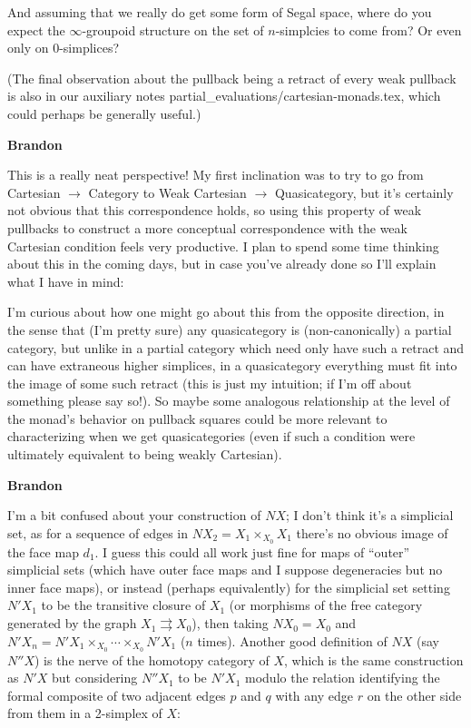 \documentclass{amsart}
\newcommand{\respond}[1]{
  \vspace{1em} \textbf{#1}
}
\begin{document}
And assuming that we really do get some form of Segal space, where do you expect the $\infty$-groupoid structure on the set of $n$-simplcies to come from? Or even only on $0$-simplices?

(The final observation about the pullback being a retract of every weak pullback is also in our auxiliary notes partial\_evaluations/cartesian-monads.tex, which could perhaps be generally useful.)

\respond{Brandon}

This is a really neat perspective!  My first inclination was to try to go from Cartesian $\rightarrow$ Category to Weak Cartesian $\rightarrow$ Quasicategory, but it's certainly not obvious that this correspondence holds, so using this property of weak pullbacks to construct a more conceptual correspondence with the weak Cartesian condition feels very productive.  I plan to spend some time thinking about this in the coming days, but in case you've already done so I'll explain what I have in mind:

I'm curious about how one might go about this from the opposite direction, in the sense that (I'm pretty sure) any quasicategory is (non-canonically) a partial category, but unlike in a partial category which need only have such a retract and can have extraneous higher simplices, in a quasicategory everything must fit into the image of some such retract (this is just my intuition; if I'm off about something please say so!). So maybe some analogous relationship at the level of the monad's behavior on pullback squares could be more relevant to characterizing when we get quasicategories (even if such a condition were ultimately equivalent to being weakly Cartesian).

\respond{Brandon}

I'm a bit confused about your construction of $NX$; I don't think it's a simplicial set, as for a sequence of edges in $NX_2 = X_1 \times_{X_0} X_1$ there's no obvious image of the face map $d_1$.  I guess this could all work just fine for maps of ``outer'' simplicial sets (which have outer face maps and I suppose degeneracies but no inner face maps), or instead (perhaps equivalently) for the simplicial set setting $N'X_1$ to be the transitive closure of $X_1$ (or morphisms of the free category generated by the graph $X_1 \rightrightarrows X_0$), then taking $NX_0=X_0$ and $N'X_n=N'X_1 \times_{X_0} \cdots \times_{X_0} N'X_1$ ($n$ times). Another good definition of $NX$ (say $N''X$) is the nerve of the homotopy category of $X$, which is the same construction as $N'X$ but considering $N''X_1$ to be $N'X_1$ modulo the relation identifying the formal composite of two adjacent edges $p$ and $q$ with any edge $r$ on the other side from them in a 2-simplex of $X$:
\end{document}
